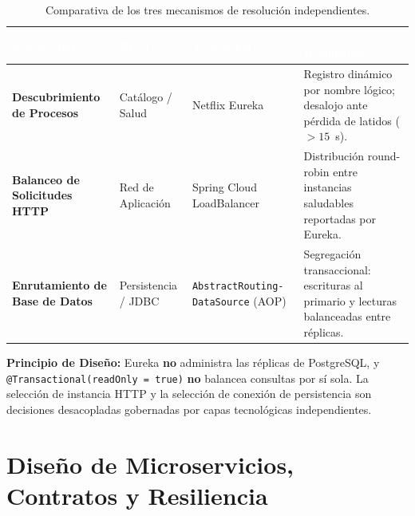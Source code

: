 \documentclass[12pt,a4paper]{article}
\begin{document}
\begin{table}[H]
\centering
\small
\begin{tabularx}{\textwidth}{@{}L{3.2cm}L{3.0cm}L{3.0cm}Y@{}}
\toprule[1.2pt]
\textcolor{white}{\textbf{Mecanismo}} & 
\textcolor{white}{\textbf{Nivel}} & 
\textcolor{white}{\textbf{Tecnolog\'{i}a}} & 
\textcolor{white}{\textbf{Criterio de Resoluci\'{o}n}} \\
\midrule[0.8pt]
\textbf{Descubrimiento de Procesos} & 
Cat\'{a}logo / Salud & 
Netflix Eureka & 
Registro din\'{a}mico por nombre l\'{o}gico; desalojo ante p\'{e}rdida de latidos ($> 15$~s). \\
\textbf{Balanceo de Solicitudes HTTP} & 
Red de Aplicaci\'{o}n & 
Spring Cloud LoadBalancer & 
Distribuci\'{o}n round-robin entre instancias saludables reportadas por Eureka. \\
\textbf{Enrutamiento de Base de Datos} & 
Persistencia / JDBC & 
\texttt{AbstractRouting-} \texttt{DataSource} (AOP) & 
Segregaci\'{o}n transaccional: escrituras al primario y lecturas balanceadas entre r\'{e}plicas. \\
\bottomrule[1.2pt]
\end{tabularx}
\caption{Comparativa de los tres mecanismos de resoluci\'{o}n independientes.}
\label{tab:mecanismos}
\end{table}

\begin{tcolorbox}[formalbox]
\textbf{Principio de Dise\~{n}o:} Eureka \textbf{no} administra las r\'{e}plicas de PostgreSQL, y \texttt{@Transactional(readOnly = true)} \textbf{no} balancea consultas por s\'{i} sola. La selecci\'{o}n de instancia HTTP y la selecci\'{o}n de conexi\'{o}n de persistencia son decisiones desacopladas gobernadas por capas tecnol\'{o}gicas independientes.
\end{tcolorbox}

\clearpage

\section{Dise\~{n}o de Microservicios, Contratos y Resiliencia}
\end{document}
